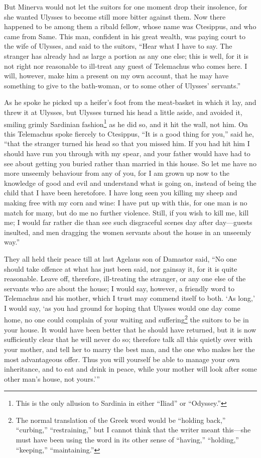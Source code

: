 But Minerva would not let the suitors for one moment drop their insolence, for
she wanted Ulysses to become still more bitter against them. Now there happened
to be among them a ribald fellow, whose name was Ctesippus, and who came from
Same. This man, confident in his great wealth, was paying court to the wife of
Ulysses, and said to the suitors, “Hear what I have to say. The stranger has
already had as large a portion as any one else; this is well, for it is not
right nor reasonable to ill-treat any guest of Telemachus who comes here. I
will, however, make him a present on my own account, that he may have something
to give to the bath-woman, or to some other of Ulysses’ servants.”

As he spoke he picked up a heifer’s foot from the meat-basket in which it lay,
and threw it at Ulysses, but Ulysses turned his head a little aside, and
avoided it, smiling grimly Sardinian fashion\footnote{This is the only allusion to Sardinia in either “Iliad” or “Odyssey.”} as he did so, and it hit the wall,
not him. On this Telemachus spoke fiercely to Ctesippus, “It is a good thing
for you,” said he, “that the stranger turned his head so that you missed him.
If you had hit him I should have run you through with my spear, and your father
would have had to see about getting you buried rather than married in this
house. So let me have no more unseemly behaviour from any of you, for I am
grown up now to the knowledge of good and evil and understand what is going on,
instead of being the child that I have been heretofore. I have long seen you
killing my sheep and making free with my corn and wine: I have put up with
this, for one man is no match for many, but do me no further violence. Still,
if you wish to kill me, kill me; I would far rather die than see such
disgraceful scenes day after day—guests insulted, and men dragging the women
servants about the house in an unseemly way.”

They all held their peace till at last Agelaus son of Damastor said, “No one
should take offence at what has just been said, nor gainsay it, for it is quite
reasonable. Leave off, therefore, ill-treating the stranger, or any one else of
the servants who are about the house; I would say, however, a friendly word to
Telemachus and his mother, which I trust may commend itself to both. ‘As long,’
I would say, ‘as you had ground for hoping that Ulysses would one day come
home, no one could complain of your waiting and suffering\footnote{The normal translation of the Greek word would be “holding back,” “curbing,”
“restraining,” but I cannot think that the writer meant this—she must have
been using the word in its other sense of “having,” “holding,” “keeping,”
“maintaining.”} the suitors to
be in your house. It would have been better that he should have returned, but
it is now sufficiently clear that he will never do so; therefore talk all this
quietly over with your mother, and tell her to marry the best man, and the one
who makes her the most advantageous offer. Thus you will yourself be able to
manage your own inheritance, and to eat and drink in peace, while your mother
will look after some other man’s house, not yours.’”

